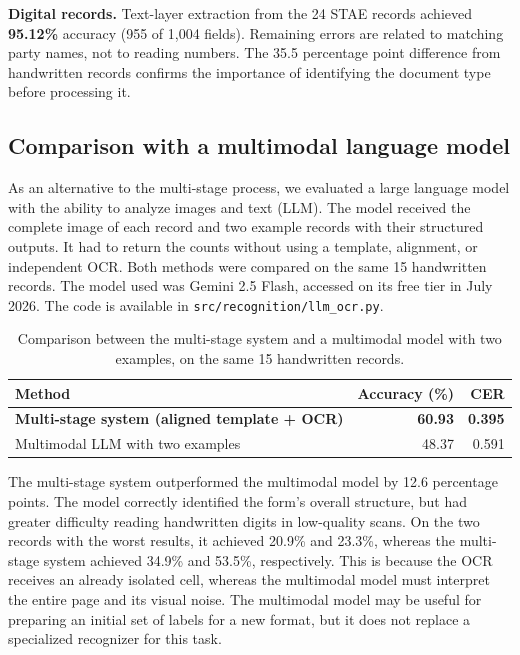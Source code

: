 \documentclass[conference]{IEEEtran}
\begin{document}
\textbf{Digital records.} Text-layer extraction from the 24 STAE records
achieved \textbf{95.12\%} accuracy (955 of 1,004 fields). Remaining errors are
related to matching party names, not to reading numbers. The 35.5 percentage
point difference from handwritten records confirms the importance of identifying
the document type before processing it.

\subsection{Comparison with a multimodal language model}
\label{sec:llm}
As an alternative to the multi-stage process, we evaluated a large language
model with the ability to analyze images and text (LLM). The model received the
complete image of each record and two example records with their structured
outputs. It had to return the counts without using a template, alignment, or
independent OCR. Both methods were compared on the same 15 handwritten records.
The model used was Gemini 2.5 Flash, accessed on its free tier in July 2026.
The code is available in \texttt{src/recognition/llm\_ocr.py}.

\begin{table}[t]
\caption{Comparison between the multi-stage system and a multimodal model with
two examples, on the same 15 handwritten records.}
\label{tab:llm}
\centering
\begin{tabular}{lrr}
\toprule
Method & Accuracy (\%) & CER \\
\midrule
\textbf{Multi-stage system (aligned template + OCR)} & \textbf{60.93} & \textbf{0.395} \\
Multimodal LLM with two examples & 48.37 & 0.591 \\
\bottomrule
\end{tabular}
\end{table}

The multi-stage system outperformed the multimodal model by 12.6 percentage
points. The model correctly identified the form's overall structure, but had
greater difficulty reading handwritten digits in low-quality scans. On the two
records with the worst results, it achieved 20.9\% and 23.3\%, whereas the
multi-stage system achieved 34.9\% and 53.5\%, respectively. This is because
the OCR receives an already isolated cell, whereas the multimodal model must
interpret the entire page and its visual noise. The multimodal model may be
useful for preparing an initial set of labels for a new format, but it does not
replace a specialized recognizer for this task.
\end{document}
